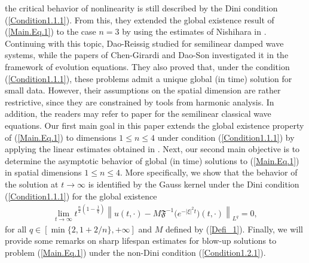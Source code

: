 \documentclass[11pt,reqno]{amsart}
\begin{document}
the critical behavior of nonlinearity is still described by the Dini condition (\ref{Condition1.1.1}). From this, they extended the global existence result of (\ref{Main.Eq.1}) to the case $n=3$ by using the estimates of Nishihara in \cite{Nishihara2003}. Continuing with this topic, Dao-Reissig \cite{AnhRei2021} studied for semilinear damped wave systems, while the papers of Chen-Girardi \cite{ChenGirardi2025} and Dao-Son \cite{DaoSon2025} investigated it in the framework of evolution equations. They also proved that, under the condition (\ref{Condition1.1.1}), these problems admit a unique global (in time) solution for small data. However, their assumptions on the spatial dimension are rather restrictive, since they are constrained by tools from harmonic analysis. In addition, the readers may refer to paper \cite{ChenReissig2024} for the semilinear classical wave equations. Our first main goal in this paper extends the global existence property of (\ref{Main.Eq.1}) to dimensions $1 \leq n \leq 4$ under condition (\ref{Condition1.1.1}) by applying the linear estimates obtained in \cite{Ikeda2019}. Next, our second main objective is to determine the asymptotic behavior of global (in time) solutions to (\ref{Main.Eq.1}) in spatial dimensions $1 \leq n \leq 4$. More specifically, we show that the behavior of the solution at $t \to \infty$ is identified by the Gauss kernel under the Dini condition (\ref{Condition1.1.1}) for the global existence 
\begin{align*}
    \lim_{t \to \infty} t^{\frac{n}{2}(1-\frac{1}{q})}\left\|u(t,\cdot)- M \mathfrak{F}^{-1}\big(e^{-|\xi|^2t}\big)(t,\cdot) \right\|_{L^q} = 0,
\end{align*}
for all $q \in \left[\min\{2, 1+2/n\}, +\infty\right]$ and $M$ defined by (\ref{Defi_1}). Finally, we will provide some remarks on sharp lifespan estimates for blow-up solutions to problem (\ref{Main.Eq.1}) under the non-Dini condition (\ref{Condition1.2.1}).
\vspace{0.3cm}
\end{document}
